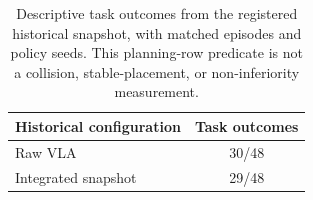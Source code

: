 \begin{table}[t]
\centering
\begin{tabular}{lc}
\toprule
Historical configuration & Task outcomes \\
\midrule
Raw VLA & 30/48 \\
Integrated snapshot & 29/48 \\
\bottomrule
\end{tabular}
\caption{Descriptive task outcomes from the registered historical snapshot, with
matched episodes and policy seeds. This planning-row predicate is not a collision,
stable-placement, or non-inferiority measurement.}
\label{tab:descriptive}
\end{table}
